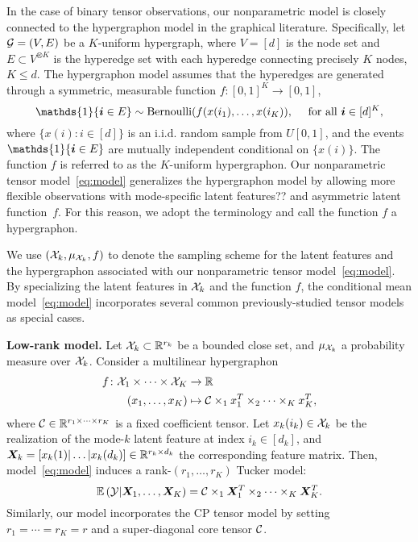\documentclass{article}
\theoremstyle{plain}
\theoremstyle{definition}
\begin{document}
In the case of binary tensor observations, our nonparametric model is closely connected to the hypergraphon model in the graphical literature. Specifically, let $\mathcal{G}=(V, E)$ be a $K$-uniform hypergraph, where $V=[d]$ is the node set and $E\subset V^{\otimes K}$ is the hyperedge set with each hyperedge connecting precisely $K$ nodes, $K\leq d$. The hypergraphon model assumes that the hyperedges are generated through a symmetric, measurable function $f\colon[0,1]^K \to [0,1]$,
\[
\mathds{1}\{\mi\in E\} \sim \text{Bernoulli}(f(x(i_1), \ldots,x(i_K)),\quad \text{ for all }\mi\in[d]^K,
\]
where $\{x(i)\colon i\in[d]\}$ is an i.i.d. random sample from $U[0,1]$, and the events $\mathds{1}\{\mi\in E\}$ are mutually independent conditional on $\{x(i)\}$. The function $f$ is referred to as the $K$-uniform hypergraphon. Our nonparametric tensor model~\eqref{eq:model} generalizes the hypergraphon model by allowing more flexible observations with {\color{red}mode-specific latent features??} and asymmetric latent function~$f$. For this reason, we adopt the terminology and call the function $f$ a hypergraphon. 

We use $(\mathcal{X}_k, \mu_{\mathcal{X}_k}, f)$ to denote the sampling scheme for the latent features and the hypergraphon associated with our nonparametric tensor model~\eqref{eq:model}. By specializing the latent features in $\mathcal{X}_k$ and the function $f$, the conditional mean model~\eqref{eq:model} incorporates several common previously-studied tensor models as special cases. 


{\bf Low-rank model.} Let $\mathcal{X}_k\subset\mathbb{R}^{r_k}$ be a bounded close set, and $\mu_{\mathcal{X}_k}$ a probability measure over $\mathcal{X}_k$. Consider a multilinear hypergraphon
\begin{align}\label{eq:linear}
f\colon \mathcal{X}_1\times \cdots \times \mathcal{X}_K &\to \mathbb{R}\\
(x_1,\ldots,x_K) &\mapsto \mathcal{C}\times_1 x^T_1\times_2\cdots\times_K x^T_K,
\end{align}
where $\mathcal{C}\in\mathbb{R}^{r_1\times \cdots \times r_K}$ is a fixed coefficient tensor. Let $x_k(i_k)\in \mathcal{X}_k$ be the realization of the mode-$k$ latent feature at index $i_k\in[d_k]$, and $\bm X_k=[x_k(1)|\ldots|x_k(d_k)]\in\mathbb{R}^{r_k\times d_k}$ the corresponding feature matrix. Then, model~\eqref{eq:model} induces a rank-$(r_1,\ldots,r_K)$ Tucker model:
\begin{equation}\label{eq:Tucker}
\mathbb{E}\left(\mathcal{Y}|\bm X_1,\ldots,\bm X_K\right)=\mathcal{C}\times_1\bm X^T_1\times_2\cdots \times_K \bm X^T_K.
\end{equation}
Similarly, our model incorporates the CP tensor model by setting $r_1=\cdots=r_K=r$ and a super-diagonal core tensor $\mathcal{C}$.
\end{document}
